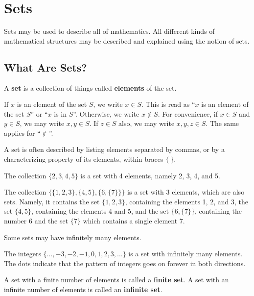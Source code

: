 \chapter{Sets}
Sets may be used to describe all of mathematics. All different kinds of mathematical structures may be described and explained using the notion of sets.

\section{What Are Sets?}
\begin{definition}
    A \textbf{set} is a collection of things called \textbf{elements} of the set.
\end{definition}
If $x$ is an element of the set $S$, we write $x \in S$. This is read as ``$x$ is an element of the set $S$'' or ``$x$ is in $S$''. Otherwise, we write $x \notin S$. For convenience, if $x \in S$ and $y \in S$, we may write $x, y \in S$. If $z \in S$ also, we may write $x, y, z \in S$. The same applies for ``$\notin$''.

A set is often described by listing elements separated by commas, or by a characterizing property of its elements, within braces $\{ \ \}$. 
\begin{example}
    The collection $\{2, 3, 4, 5\}$ is a set with 4 elements, namely 2, 3, 4, and 5.
\end{example}
\begin{example}
    The collection $\{\{1, 2, 3\}, \{4, 5\}, \{6, \{7\}\}\}$ is a set with 3 elements, which are also sets. Namely, it contains the set $\{1, 2, 3\}$, containing the elements 1, 2, and 3, the set $\{4, 5\}$, containing the elements 4 and 5, and the set $\{6, \{7\}\}$, containing the number 6 and the set $\{7\}$ which contains a single element 7.
\end{example}

Some sets may have infinitely many elements.
\begin{example}
    The integers $\{\dots, -3, -2, -1, 0, 1, 2, 3, \dots\}$ is a set with infinitely many elements. The dots indicate that the pattern of integers goes on forever in both directions.
\end{example}

\begin{definition}
    A set with a finite number of elements is called a \textbf{finite set}. A set with an infinite number of elements is called an \textbf{infinite set}.
\end{definition}

